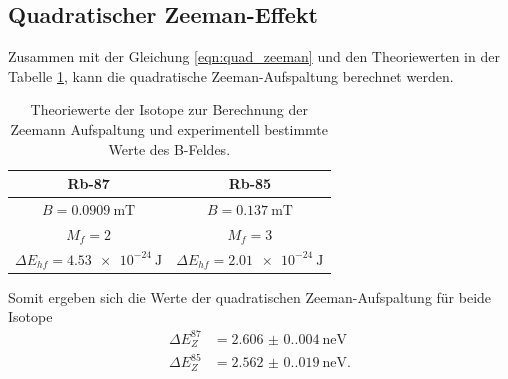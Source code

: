 \subsection{Quadratischer Zeeman-Effekt}
\label{sec:quadratischer-zeeman-effekt}

Zusammen mit der Gleichung \ref{eqn:quad_zeeman} und den Theoriewerten in der Tabelle \ref{tab:zee}, kann die
quadratische Zeeman-Aufspaltung berechnet werden.

\begin{table}
    \centering
    \caption{Theoriewerte der Isotope zur Berechnung der Zeemann Aufspaltung und experimentell bestimmte Werte des B-Feldes. \cite{pumpen}}
    \label{tab:zee}
    \begin{tabular}{c c}
        \toprule
        Rb-87 & Rb-85\\
        \midrule
        $B = \qty{0.0909}{\milli\tesla}$ & $B = \qty{0.137}{\milli\tesla}$ \\
        $M_f = 2$ & $M_f = 3$ \\
        $\Delta E_{hf} = \qty{4.53e-24}{\joule} $ & $\Delta E_{hf} = \qty{2.01e-24}{\joule} $ \\
        \bottomrule
    \end{tabular}
\end{table}

Somit ergeben sich die Werte der quadratischen Zeeman-Aufspaltung für beide Isotope
\begin{align}
    \Delta E_Z^{87} &= \qty{2.606(0.004)}{\nano\eV} \\
    \Delta E_Z^{85} &= \qty{2.562(0.019)}{\nano\eV} .
\end{align}
